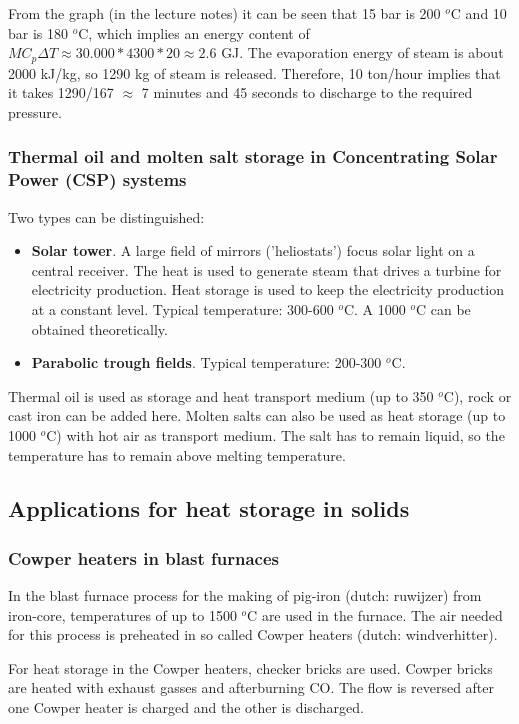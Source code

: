\documentclass[a4paper,10pt]{article}
\begin{document}
From the graph (in the lecture notes) it can be seen that 15 bar is 200 $^o$C and 10 bar is 180 $^o$C, which implies an energy content of $MC_p \Delta T \approx 30.000*4300*20 \approx 2.6$ GJ. The evaporation energy of steam is about 2000 kJ/kg, so 1290 kg of steam is released. Therefore, 10 ton/hour implies that it takes 1290/167 $\approx$ 7 minutes and 45 seconds to discharge to the required pressure.

\subsubsection{Thermal oil and molten salt storage in Concentrating Solar Power (CSP) systems}
Two types can be distinguished:
\begin{itemize}
 \item \textbf{Solar tower}. A large field of mirrors ('heliostats') focus solar light on a central receiver. The heat is used to generate steam that drives a turbine for electricity production. Heat storage is used to keep the electricity production at a constant level. Typical temperature: 300-600 $^o$C. A 1000 $^o$C can be obtained theoretically. 
 \item \textbf{Parabolic trough fields}. Typical temperature: 200-300 $^o$C.
\end{itemize}

Thermal oil is used as storage and heat transport medium (up to 350 $^o$C), rock or cast iron can be added here. Molten salts can also be used as heat storage (up to 1000 $^o$C) with hot air as transport medium. The salt has to remain liquid, so the temperature has to remain above melting temperature. 

\subsection{Applications for heat storage in solids}

\subsubsection{Cowper heaters in blast furnaces}
In the blast furnace process for the making of pig-iron (dutch: ruwijzer) from iron-core, temperatures of up to 1500 $^o$C are used in the furnace. The air needed for this process is preheated in so called Cowper heaters (dutch: windverhitter). \bigskip

For heat storage in the Cowper heaters, checker bricks are used. Cowper bricks are heated with exhaust gasses and afterburning CO. The flow is reversed after one Cowper heater is charged and the other is discharged.
\end{document}
